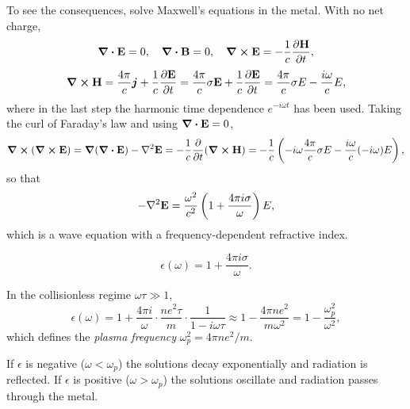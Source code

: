To see the consequences, solve Maxwell's equations in the metal. With no net charge,
\begin{equation}
    \div \cvect{E} = 0, \quad \div\cvect{B} = 0, \quad \curl\cvect{E} = -\frac{1}{c}\pdv{\cvect{H}}{t},
\end{equation}
\begin{equation}
    \curl\cvect{H} = \frac{4\pi}{c}\lvect{j} + \frac{1}{c}\pdv{\cvect{E}}{t}
    = \frac{4\pi}{c}\sigma\cvect{E} + \frac{1}{c}\pdv{\cvect{E}}{t}
    = \frac{4\pi}{c}\sigma E - \frac{i\omega}{c}E,
\end{equation}
where in the last step the harmonic time dependence $e^{-i\omega t}$ has been used. Taking the curl of Faraday's law and using $\div\cvect{E} = 0$,
\begin{equation}
    \curl(\curl \cvect{E}) = \grad(\div\cvect{E}) - \laplacian{\cvect{E}} = -\frac{1}{c}\pdv{t}(\curl \cvect{H})
    = -\frac{1}{c}\left(-i\omega\frac{4\pi}{c}\sigma E - \frac{i\omega}{c}(-i\omega)E\right),
\end{equation}
so that
\begin{equation}
    -\laplacian{\cvect{E}} = \frac{\omega^2}{c^2}\left(1 + \frac{4\pi i \sigma}{\omega}\right)E,
\end{equation}
which is a wave equation with a frequency-dependent refractive index.

\begin{definition}
\begin{equation}
    \epsilon(\omega) = 1 + \frac{4\pi i \sigma}{\omega}.
\end{equation}
\end{definition}

In the collisionless regime $\omega\tau \gg 1$,
\begin{equation}
    \epsilon(\omega) = 1 + \frac{4\pi i}{\omega}\cdot\frac{ne^2\tau}{m}\cdot\frac{1}{1 - i\omega\tau}
    \approx 1 - \frac{4\pi n e^2}{m\omega^2} = 1 - \frac{\omega_p^2}{\omega^2},
\end{equation}
which defines the \emph{plasma frequency} $\omega_p^2 = 4\pi ne^2/m$.

\begin{fact}
If $\epsilon$ is negative ($\omega < \omega_p$) the solutions decay exponentially and radiation is reflected. If $\epsilon$ is positive ($\omega > \omega_p$) the solutions oscillate and radiation passes through the metal.
\end{fact}

